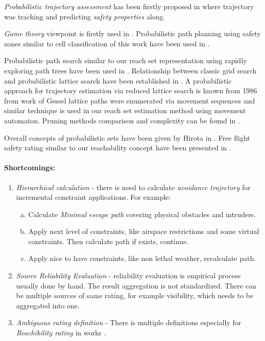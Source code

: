 \emph{Probabilistic trajectory assessment} has been firstly proposed in \cite{kim2007uav} where trajectory was tracking and predicting \emph{safety properties} along. 

\emph{Game theory} viewpoint is firstly used in \cite{vidal2002probabilistic}. Probabilistic path planning using safety zones similar to cell classification of this work have been used in \cite{pfeiffer2005path}.

Probabilistic path search similar to our reach set representation using rapidly exploring path trees have been used in \cite{kothari2013probabilistically,blackmore2006probabilistic}. Relationship between classic grid search and probabilistic lattice search have been established in \cite{lavalle2004relationship}. A probabilistic approach for trajectory estimation via reduced lattice search is known from 1986 from work of Gessel \cite{gessel1986probabilistic} lattice paths were enumerated via movement sequences and similar technique is used in our reach set estimation method using movement automaton.  Pruning methods comparison and complexity can be found in \cite{esposito1997comparative}.

Overall concepts of probabilistic sets have been given by Hirota in \cite{hirota1981concepts}.  Free flight safety rating similar to our reachability concept have been presented in \cite{hoekstra2002designing}.

\paragraph{Shortcomings:} 

\begin{enumerate}
    \item \emph{Hierarchical calculation} - there is need to calculate \emph{avoidance trajectory} for incremental constraint applications. For example:
    \begin{enumerate}[a.]
        \item Calculate \emph{Minimal escape path} covering physical obstacles and intruders.
        \item Apply next level of constraints, like airspace restrictions and some virtual constraints. Then calculate path if exists, continue.
        \item Apply nice to have constraints, like non lethal weather, recalculate path.
    \end{enumerate}
    
    \item \emph{Source Reliability Evaluation} -  reliability evaluation is empirical process usually done by hand. The result aggregation is not standardized. There can be multiple sources of same rating, for example visibility, which needs to be aggregated into one.  
    
    \item \emph{Ambiguous rating definition} - There is multiple definitions especially for \emph{Reachibility rating} in works \cite{kothari2013probabilistically,blackmore2006probabilistic,gessel1986probabilistic}.
    
\end{enumerate}

